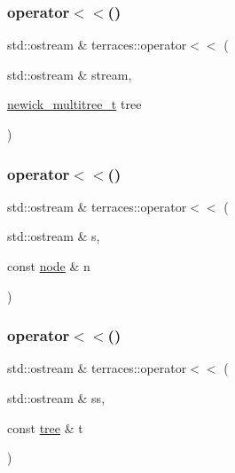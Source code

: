 \mbox{\label{namespaceterraces_ad5d0342efed28b0bd79f604eb73f9b61}} 
\subsubsection{\texorpdfstring{operator$<$$<$()}{operator<<()}\hspace{0.1cm}{\footnotesize\ttfamily [4/7]}}
{\footnotesize\ttfamily std\+::ostream \& terraces\+::operator$<$$<$ (\begin{DoxyParamCaption}\item[{std\+::ostream \&}]{stream,  }\item[{\hyperlink{structterraces_1_1newick__multitree__t}{newick\+\_\+multitree\+\_\+t}}]{tree }\end{DoxyParamCaption})}

\mbox{\label{namespaceterraces_a734f29a465c2d80d4ee38d00ba2f7460}} 
\subsubsection{\texorpdfstring{operator$<$$<$()}{operator<<()}\hspace{0.1cm}{\footnotesize\ttfamily [5/7]}}
{\footnotesize\ttfamily std\+::ostream \& terraces\+::operator$<$$<$ (\begin{DoxyParamCaption}\item[{std\+::ostream \&}]{s,  }\item[{const \hyperlink{structterraces_1_1node}{node} \&}]{n }\end{DoxyParamCaption})}

\mbox{\label{namespaceterraces_a9699b2c445ed0b3ca46836c7d0500817}} 
\subsubsection{\texorpdfstring{operator$<$$<$()}{operator<<()}\hspace{0.1cm}{\footnotesize\ttfamily [6/7]}}
{\footnotesize\ttfamily std\+::ostream \& terraces\+::operator$<$$<$ (\begin{DoxyParamCaption}\item[{std\+::ostream \&}]{ss,  }\item[{const \hyperlink{namespaceterraces_a07aaf7feec4a22c6cdefc14c5a81bdd0}{tree} \&}]{t }\end{DoxyParamCaption})}

